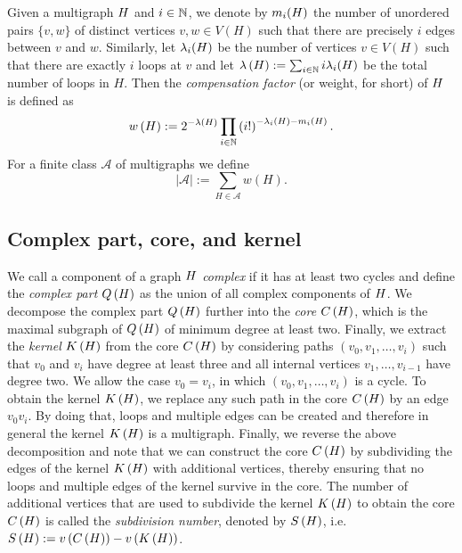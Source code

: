 \begin{definition}\label{CBdef:weight}
Given a multigraph $H$ and $i \in \mathbb{N}$, we denote by $m_i(H)$ the number of unordered pairs $\{v, w\}$ of distinct vertices $v, w\in V(H)$ such that there are precisely $i$ edges between $v$ and $w$. Similarly, let $\lambda_i(H)$ be the number of vertices $v\in V(H)$ such that there are exactly $i$ loops at $v$ and let $\lambda\left(H\right):=\sum_{i \in \mathbb{N}}i\lambda_i(H)$ be the total number of loops in $H$. Then the {\em compensation factor} (or weight, for short) of $H$ is defined as
	\begin{align}\label{CBeq:weight}
	w\left(H\right):=2^{-\lambda\left(H\right)}\prod_{i \in \mathbb{N}}\left(i!\right)^{-\lambda_i(H)-m_i(H)}.
	\end{align}
	For a finite class $\mathcal{A}$ of multigraphs we define
	\[
	|\mathcal{A}|:=\sum_{H \in \mathcal{A}}w(H).
	\]
\end{definition}

\subsection{Complex part, core, and kernel}\label{CBsub:dec}
We call a component of a graph $H$ {\em complex} if it has at least two cycles and define the {\em complex part} $Q\left(H\right)$ as the union of all complex components of $H$. We decompose the complex part $Q\left(H\right)$ further into the {\em core} $C\left(H\right)$, which is the maximal subgraph of $Q\left(H\right)$ of minimum degree at least two. Finally, we extract the {\em kernel} $K\left(H\right)$ from the core $C\left(H\right)$ by considering paths $(v_0, v_1, \ldots, v_i)$ such that $v_0$ and $v_i$ have degree at least three and all internal vertices $v_1, \ldots, v_{i-1}$ have degree two. We allow the case $v_0=v_i$, in which $(v_0, v_1, \ldots, v_i)$ is a cycle. To obtain the kernel $K\left(H\right)$, we replace any such path in the core $C\left(H\right)$ by an edge $v_0v_i$. By doing that, loops and multiple edges can be created and therefore in general the kernel $K\left(H\right)$ is a multigraph. Finally, we reverse the above decomposition and note that we can construct the core $C\left(H\right)$ by subdividing the edges of the kernel $K\left(H\right)$ with additional vertices, thereby ensuring that no loops and multiple edges of the kernel survive in the core. The number of additional vertices that are used to subdivide the kernel $K\left(H\right)$ to obtain the core $C\left(H\right)$ is called the {\em subdivision number}, denoted by $S\left(H\right)$, i.e. $S\left(H\right):=v\left({C\left(H\right)}\right)-v\left({K\left(H\right)}\right)$.


